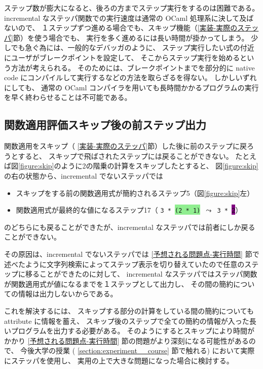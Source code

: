 ステップ数が膨大になると、後ろの方までステップ実行をするのは困難である。
incremental なステッパ関数での実行速度は通常の OCaml 処理系に決して及ばないので、
１ステップずつ進める場合でも、スキップ機能（\ref{実装-実際のステッパ}節）を使う場合でも、
実行を多く進めるには長い時間が掛かってしまう。
少しでも急ぐ為には、一般的なデバッガのように、
ステップ実行したい式の付近にユーザがブレークポイントを設定して、
そこからステップ実行を始めるという方法が考えられる。
そのためには、ブレークポイントまでを部分的に native code にコンパイルして実行するなどの方法を取らざるを得ない。
しかしいずれにしても、
通常の OCaml コンパイラを用いても長時間かかるプログラムの実行を早く終わらせることは不可能である。

\subsection{関数適用評価スキップ後の前ステップ出力}

関数適用をスキップ（ \ref{実装-実際のステッパ}節）した後に前のステップに戻ろうとすると、
スキップで飛ばされたステップには戻ることができない。
たとえば図\ref{figure:skip}のように2の階乗の計算をスキップしたとすると、
図\ref{figure:skip}の右の状態から、incremental でないステッパでは
\begin{itemize}
\item スキップをする前の関数適用式が簡約されるステップ5（図\ref{figure:skip}左）
\item 関数適用式が最終的な値になるステップ17（
\texttt{3 * \colorbox{lightgreen}{(2 * 1)} $\leadsto$ 3 * \colorbox{purple}{2}}）
\end{itemize}
のどちらにも戻ることができたが、incremental なステッパでは前者にしか戻ることができない。

その原因は、incremental でないステッパでは \ref{予想される問題点-実行時間}
節で述べたように文字列検索によってステップ表示を切り替えていたので任意のステップに移ることができたのに対して、
incremental なステッパではステッパ関数が関数適用式が値になるまでを１ステップとして出力し、
その間の簡約についての情報は出力しないからである。

これを解決するには、
スキップする部分の計算をしている間の簡約についても attribute に情報を蓄え、
スキップ後のステップで全ての簡約の情報が入った長いプログラムを出力する必要がある。
そのようにするとスキップにより時間がかかり
\ref{予想される問題点-実行時間} 節の問題がより深刻になる可能性があるので、
今後大学の授業 ( \ref{section:experiment__course} 節で触れる) において実際にステッパを使用し、
実用の上で大きな問題になった場合に検討する。
